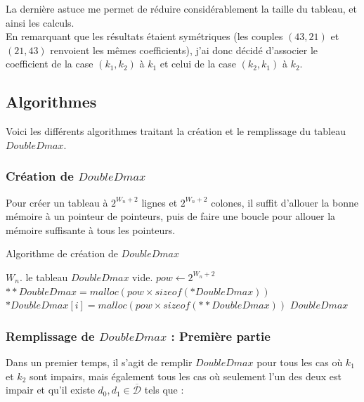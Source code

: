 \documentclass[12pt, a4paper]{memoir}
\newcommand{\dbarre}{\overline{\mathcal{D}}}
\begin{document}
      La dernière astuce me permet de réduire considérablement la taille du tableau, et ainsi les calculs. \\
      En remarquant que les résultats étaient symétriques (les couples $(43,21)$ et $(21,43)$ renvoient les mêmes coefficients),
      j'ai donc décidé d'associer le coefficient de la case $(k_1,k_2)$ à $k_1$ et celui de la case $(k_2,k_1)$ à $k_2$.
      
    \subsection{Algorithmes}
    
      Voici les différents algorithmes traitant la création et le remplissage du tableau $DoubleDmax$.
      
      \subsubsection{Création de $DoubleDmax$}

      Pour créer un tableau à $2^{W_n+2}$ lignes et $2^{W_n+2}$ colones, il suffit d'allouer la bonne mémoire à 
      un pointeur de pointeurs, puis de faire une boucle pour allouer la mémoire suffisante à tous les pointeurs.
      
\begin{algorithm}
 \caption{Algorithme de création de $DoubleDmax$}
 \begin{algorithmic}
  \REQUIRE $W_n$.
  \ENSURE le tableau $DoubleDmax$ vide.
  \STATE $pow \leftarrow 2^{W_n+2}$
  \STATE $**DoubleDmax = malloc(pow \times sizeof(*DoubleDmax))$ 
  \STATE $*DoubleDmax[i] = malloc(pow \times sizeof(**DoubleDmax))$ 
  \ENDFOR
  \RETURN $DoubleDmax$
 \end{algorithmic}
\end{algorithm}    
      
      \subsubsection{Remplissage de $DoubleDmax$ : Première partie}

      Dans un premier temps, il s'agit de remplir $DoubleDmax$ pour tous les cas où $k_1$ et $k_2$ sont impairs, 
      mais également tous les cas où  seulement l'un des deux est impair et qu'il existe $d_0,d_1 \in \dbarre$ tels que :
      
\end{document}
